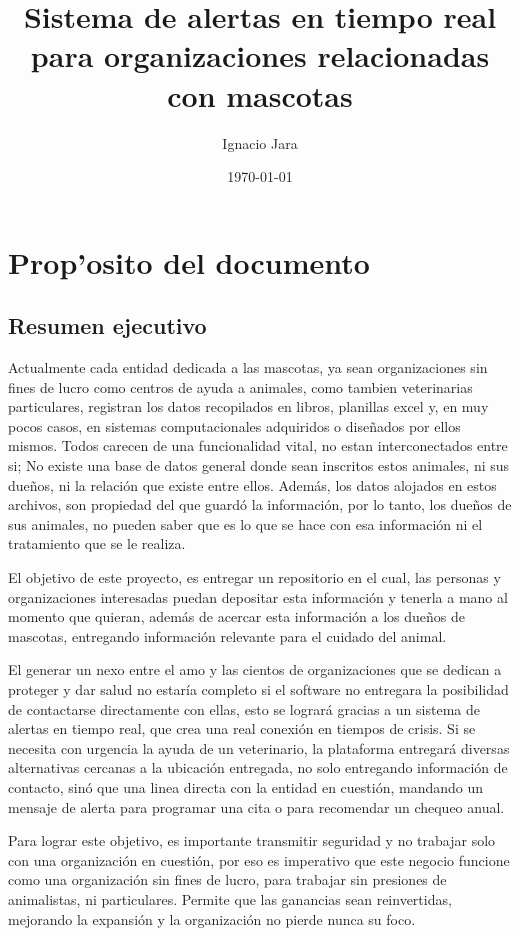 \documentclass[letterpaper,openright,10pt,oneside]{report}
\title{\textbf{Sistema de alertas en tiempo real para organizaciones relacionadas con mascotas}}
\author{Ignacio Jara}
\date{\today}
\begin{document}
\maketitle


\part{Prop'osito del documento}
	\chapter*{Resumen ejecutivo}
	
	Actualmente cada entidad dedicada a las mascotas, ya sean organizaciones sin fines de lucro como centros de ayuda a animales, como tambien veterinarias particulares, registran los datos recopilados en libros, planillas excel y, en muy pocos casos, en sistemas computacionales adquiridos o diseñados por ellos mismos. Todos carecen de una funcionalidad vital, no estan interconectados entre si; No existe una base de datos general donde sean inscritos estos animales, ni sus dueños, ni la relación que existe entre ellos.
	Además, los datos alojados en estos archivos, son propiedad del que guardó la información, por lo tanto, los dueños de sus animales, no pueden saber que es lo que se hace con esa información ni el tratamiento que se le realiza.
	
	El objetivo de este proyecto, es entregar un repositorio en el cual, las personas y organizaciones interesadas puedan depositar esta información y tenerla a mano al momento que quieran, además de acercar esta información a los dueños de mascotas, entregando información relevante para el cuidado del animal.
	
	El generar un nexo entre el amo y las cientos de organizaciones que se dedican a proteger y dar salud no estaría completo si el software no entregara la posibilidad de contactarse directamente con ellas, esto se logrará gracias a un sistema de alertas en tiempo real, que crea una real conexión en tiempos de crisis. Si se necesita con urgencia la ayuda de un veterinario, la plataforma entregará diversas alternativas cercanas a la ubicación entregada, no solo entregando información de contacto, sinó que una linea directa con la entidad en cuestión, mandando un mensaje de alerta para programar una cita o para recomendar un chequeo anual.
	
	Para lograr este objetivo, es importante transmitir seguridad y no trabajar solo con una organización en cuestión, por eso es imperativo que este negocio funcione como una organización sin fines de lucro, para trabajar sin presiones de animalistas, ni particulares. Permite que las ganancias sean reinvertidas, mejorando la expansión y la organización no pierde nunca su foco.
	
\end{document}
